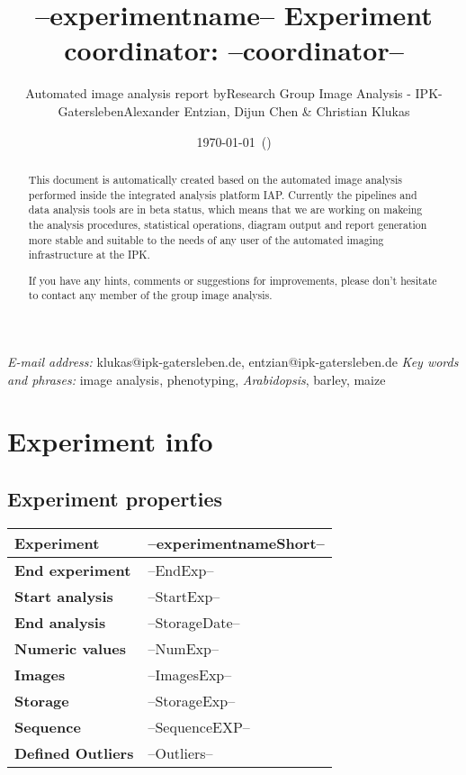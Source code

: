 % 





\title{--experimentname-- \tabularnewline \vspace{10 mm} \large{Experiment coordinator: --coordinator--}}

\author{Automated image analysis report by\tabularnewline Research
Group Image Analysis - IPK-Gatersleben\tabularnewline \tabularnewline Alexander Entzian, Dijun Chen \& Christian Klukas}

\date{\today ~(\currenttime )}

\maketitle
\thispagestyle{empty}  
\begin{abstract}
This document is automatically created based on the automated image analysis performed 
inside the integrated analysis platform IAP. Currently the pipelines and data analysis tools are in beta status, 
which means that we are working on makeing the analysis procedures, statistical operations, diagram output and report
generation more stable and suitable to the needs of any user of the automated imaging infrastructure at the IPK.

If you have any hints, comments or suggestions for improvements, please don't hesitate to contact any member
of the group image analysis.
\end{abstract}
\vfill
\small{\textit{E-mail address:} klukas@ipk-gatersleben.de, entzian@ipk-gatersleben.de}
\newline 
\small{\textit{Key words and phrases:} image analysis, phenotyping, \textit{Arabidopsis}, barley, maize }
 
\addtocounter{page}{-1}
\clearpage
\tableofcontents

\clearpage
\pagestyle{headings}
\section{Experiment info} 
\subsection{Experiment properties}
\begin{center}
	\begin{tabular}{|p{3cm}|p{13cm}|}
	\hline
	{\textbf{Experiment}} & --experimentnameShort--\tabularnewline
	\hline
	\hline
	{\textbf{End experiment}} & --EndExp--\tabularnewline
	\hline
	{\textbf{Start analysis}} & --StartExp--\tabularnewline
	\hline
	{\textbf{End analysis}} & --StorageDate--\tabularnewline
	\hline
	{\textbf{Numeric values}} & --NumExp-- \tabularnewline
	\hline
	{\textbf{Images}} & --ImagesExp-- \tabularnewline
	\hline
	{\textbf{Storage}} & --StorageExp-- \tabularnewline
	\hline
	{\textbf{Sequence}} & --SequenceEXP-- \tabularnewline
	\hline
	{\textbf{Defined Outliers}} & --Outliers-- \tabularnewline
	\hline
	\hline 
	\end{tabular}
\end{center}


